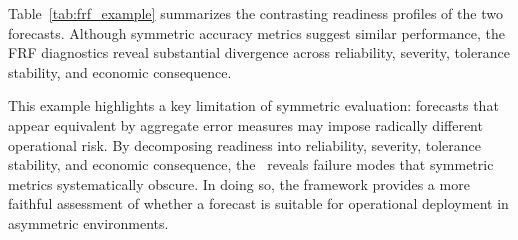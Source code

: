 Table~\ref{tab:frf_example} summarizes the contrasting readiness profiles of the two forecasts.
Although symmetric accuracy metrics suggest similar performance, the FRF diagnostics reveal
substantial divergence across reliability, severity, tolerance stability, and economic consequence.



This example highlights a key limitation of symmetric evaluation: forecasts that appear equivalent
by aggregate error measures may impose radically different operational risk. By decomposing
readiness into reliability, severity, tolerance stability, and economic consequence, the \FRF\
reveals failure modes that symmetric metrics systematically obscure. In doing so, the framework
provides a more faithful assessment of whether a forecast is suitable for operational deployment
in asymmetric environments.
